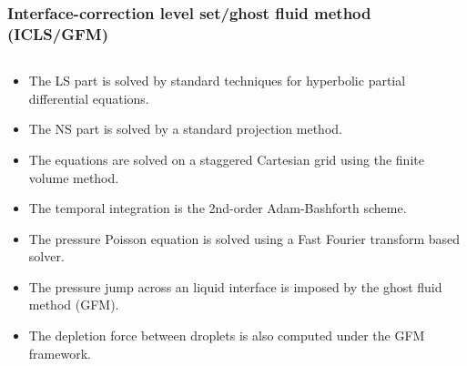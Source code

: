 \begin{frame}[noframenumbering]
\begin{columns}
    \begin{column}{0.2\textwidth}
    \end{column}
  \end{columns}

\end{frame}
\begin{frame}[noframenumbering]
  \frametitle{Interface-correction level set/ghost fluid method (ICLS/GFM)}

  \begin{columns}
    
    \begin{column}{0.9\textwidth}
      
      \begin{bluecolorbox}
        \medskip
        \begin{itemize}
        \item The LS part is solved by standard techniques for hyperbolic partial differential equations. \medskip
        \item The NS part is solved by a standard projection method. \medskip
        \item The equations are solved on a staggered Cartesian grid using the finite volume method. \medskip
        \item The temporal integration is the 2nd-order Adam-Bashforth scheme. \medskip
        \item The pressure Poisson equation is solved using a Fast Fourier transform based solver. \medskip
        \item The pressure jump across an liquid interface is imposed by the ghost fluid method (GFM). \medskip
        \item The depletion force between droplets is also computed under the GFM framework. \medskip
        \end{itemize}
      \end{bluecolorbox}
       
    \end{column}
    
  \end{columns}

  \vskip0.5cm
  \pause
  \centering
  
\end{frame}

